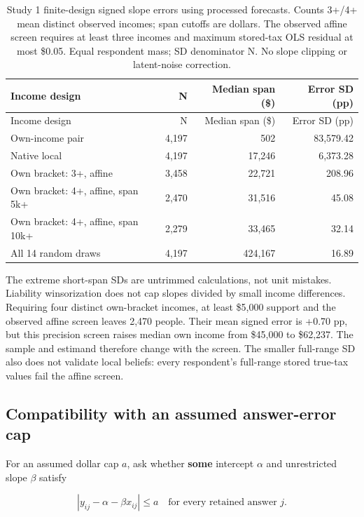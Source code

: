 \documentclass[
  11pt,
  letterpaper,
  DIV=11,
  numbers=noendperiod]{scrartcl}
\begin{document}
\begin{longtable}[]{@{}lrrr@{}}
\caption{Study 1 finite-design signed slope errors using processed
forecasts. Counts 3+/4+ mean distinct observed incomes; span cutoffs are
dollars. The observed affine screen requires at least three incomes and
maximum stored-tax OLS residual at most \$0.05. Equal respondent mass;
SD denominator N. No slope clipping or latent-noise
correction.}\label{tbl-study1-selection}\tabularnewline
\toprule\noalign{}
Income design & N & Median span (\$) & Error SD (pp) \\
\midrule\noalign{}
\endfirsthead
\toprule\noalign{}
Income design & N & Median span (\$) & Error SD (pp) \\
\midrule\noalign{}
\endhead
\bottomrule\noalign{}
\endlastfoot
Own-income pair & 4,197 & 502 & 83,579.42 \\
Native local & 4,197 & 17,246 & 6,373.28 \\
Own bracket: 3+, affine & 3,458 & 22,721 & 208.96 \\
Own bracket: 4+, affine, span 5k+ & 2,470 & 31,516 & 45.08 \\
Own bracket: 4+, affine, span 10k+ & 2,279 & 33,465 & 32.14 \\
All 14 random draws & 4,197 & 424,167 & 16.89 \\
\end{longtable}

The extreme short-span SDs are untrimmed calculations, not unit
mistakes. Liability winsorization does not cap slopes divided by small
income differences. Requiring four distinct own-bracket incomes, at
least \$5,000 support and the observed affine screen leaves 2,470
people. Their mean signed error is +0.70 pp, but this precision screen
raises median own income from \$45,000 to \$62,237. The sample and
estimand therefore change with the screen. The smaller full-range SD
also does not validate local beliefs: every respondent's full-range
stored true-tax values fail the affine screen.

\subsection{Compatibility with an assumed answer-error
cap}\label{compatibility-with-an-assumed-answer-error-cap}

For an assumed dollar cap \(a\), ask whether \textbf{some} intercept
\(\alpha\) and unrestricted slope \(\beta\) satisfy

\[|y_{ij}-\alpha-\beta x_{ij}|\leq a\quad\text{for every retained answer }j.\]
\end{document}
